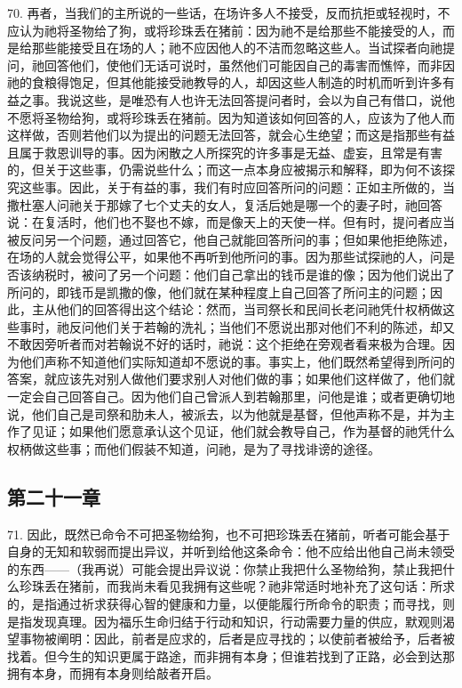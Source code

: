 70. 再者，当我们的主所说的一些话，在场许多人不接受，反而抗拒或轻视时，不应认为祂将圣物给了狗，或将珍珠丢在猪前：因为祂不是给那些不能接受的人，而是给那些能接受且在场的人；祂不应因他人的不洁而忽略这些人。当试探者向祂提问，祂回答他们，使他们无话可说时，虽然他们可能因自己的毒害而憔悴，而非因祂的食粮得饱足，但其他能接受祂教导的人，却因这些人制造的时机而听到许多有益之事。我说这些，是唯恐有人也许无法回答提问者时，会以为自己有借口，说他不愿将圣物给狗，或将珍珠丢在猪前。因为知道该如何回答的人，应该为了他人而这样做，否则若他们以为提出的问题无法回答，就会心生绝望；而这是指那些有益且属于救恩训导的事。因为闲散之人所探究的许多事是无益、虚妄，且常是有害的，但关于这些事，仍需说些什么；而这一点本身应被揭示和解释，即为何不该探究这些事。因此，关于有益的事，我们有时应回答所问的问题：正如主所做的，当撒杜塞人问祂关于那嫁了七个丈夫的女人，复活后她是哪一个的妻子时，祂回答说：在复活时，他们也不娶也不嫁，而是像天上的天使一样。但有时，提问者应当被反问另一个问题，通过回答它，他自己就能回答所问的事；但如果他拒绝陈述，在场的人就会觉得公平，如果他不再听到他所问的事。因为那些试探祂的人，问是否该纳税时，被问了另一个问题：他们自己拿出的钱币是谁的像；因为他们说出了所问的，即钱币是凯撒的像，他们就在某种程度上自己回答了所问主的问题；因此，主从他们的回答得出这个结论：然而，当司祭长和民间长老问祂凭什权柄做这些事时，祂反问他们关于若翰的洗礼；当他们不愿说出那对他们不利的陈述，却又不敢因旁听者而对若翰说不好的话时，祂说：这个拒绝在旁观者看来极为合理。因为他们声称不知道他们实际知道却不愿说的事。事实上，他们既然希望得到所问的答案，就应该先对别人做他们要求别人对他们做的事；如果他们这样做了，他们就一定会自己回答自己。因为他们自己曾派人到若翰那里，问他是谁；或者更确切地说，他们自己是司祭和肋未人，被派去，以为他就是基督，但他声称不是，并为主作了见证；如果他们愿意承认这个见证，他们就会教导自己，作为基督的祂凭什么权柄做这些事；而他们假装不知道，问祂，是为了寻找诽谤的途径。\par


\subsection{第二十一章}

71. 因此，既然已命令不可把圣物给狗，也不可把珍珠丢在猪前，听者可能会基于自身的无知和软弱而提出异议，并听到给他这条命令：他不应给出他自己尚未领受的东西——（我再说）可能会提出异议说：你禁止我把什么圣物给狗，禁止我把什么珍珠丢在猪前，而我尚未看见我拥有这些呢？祂非常适时地补充了这句话：所求的，是指通过祈求获得心智的健康和力量，以便能履行所命令的职责；而寻找，则是指发现真理。因为福乐生命归结于行动和知识，行动需要力量的供应，默观则渴望事物被阐明：因此，前者是应求的，后者是应寻找的；以使前者被给予，后者被找着。但今生的知识更属于路途，而非拥有本身；但谁若找到了正路，必会到达那拥有本身，而拥有本身则给敲者开启。\par

